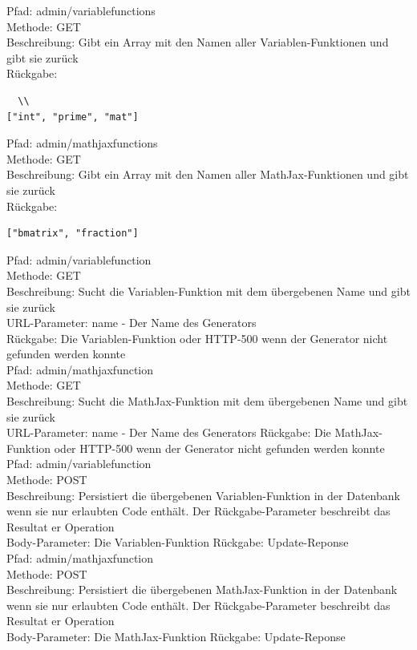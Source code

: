 \noindent Pfad: admin/variablefunctions \\
Methode: GET \\
Beschreibung: Gibt ein Array mit den Namen aller Variablen-Funktionen und gibt sie zurück \\
Rückgabe: \begin{lstlisting}  \\
["int", "prime", "mat"]
\end{lstlisting}

\noindent Pfad: admin/mathjaxfunctions \\
Methode: GET \\
Beschreibung: Gibt ein Array mit den Namen aller MathJax-Funktionen und gibt sie zurück \\
Rückgabe: \begin{lstlisting} 
["bmatrix", "fraction"]
\end{lstlisting}

\noindent Pfad: admin/variablefunction \\
Methode: GET \\
Beschreibung: Sucht die Variablen-Funktion mit dem übergebenen Name und gibt sie zurück \\
URL-Parameter: name - Der Name des Generators \\
Rückgabe: Die Variablen-Funktion oder HTTP-500 wenn der Generator nicht gefunden werden konnte \\

\noindent Pfad: admin/mathjaxfunction \\
Methode: GET \\
Beschreibung: Sucht die MathJax-Funktion mit dem übergebenen Name und gibt sie zurück \\
URL-Parameter: name - Der Name des Generators
Rückgabe: Die MathJax-Funktion oder HTTP-500 wenn der Generator nicht gefunden werden konnte \\

\noindent Pfad: admin/variablefunction \\
Methode: POST \\
Beschreibung: Persistiert die übergebenen Variablen-Funktion in der Datenbank wenn sie nur erlaubten Code enthält. Der Rückgabe-Parameter beschreibt das Resultat er Operation \\
Body-Parameter: Die Variablen-Funktion
Rückgabe: Update-Reponse \\

\noindent Pfad: admin/mathjaxfunction \\
Methode: POST \\
Beschreibung: Persistiert die übergebenen MathJax-Funktion in der Datenbank wenn sie nur erlaubten Code enthält. Der Rückgabe-Parameter beschreibt das Resultat er Operation \\
Body-Parameter: Die MathJax-Funktion
Rückgabe: Update-Reponse \\

